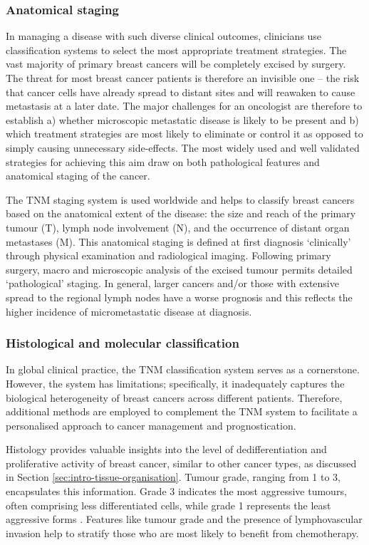 \subsubsection{Anatomical staging}

In managing a disease with such diverse clinical outcomes, clinicians use classification systems to select the most appropriate treatment strategies. The vast majority of primary breast cancers will be completely excised by surgery. The threat for most breast cancer patients is therefore an invisible one – the risk that cancer cells have already spread to distant sites and will reawaken to cause metastasis at a later date. The major challenges for an oncologist are therefore to establish a) whether microscopic metastatic disease is likely to be present and b) which treatment strategies are most likely to eliminate or control it as opposed to simply causing unnecessary side-effects. The most widely used and well validated strategies for achieving this aim draw on both pathological features and anatomical staging of the cancer.

The TNM staging system is used worldwide and helps to classify breast cancers based on the anatomical extent of the disease: the size and reach of the primary tumour (T), lymph node involvement (N), and the occurrence of distant organ metastases (M). This anatomical staging is defined at first diagnosis `clinically' through physical examination and radiological imaging. Following primary surgery, macro and microscopic analysis of the excised tumour permits detailed `pathological' staging.  In general, larger cancers and/or those with extensive spread to the regional lymph nodes have a worse prognosis and this reflects the higher incidence of micrometastatic disease at diagnosis. 

\subsubsection{Histological and molecular classification}

In global clinical practice, the TNM classification system serves as a cornerstone. However, the system has limitations; specifically, it inadequately captures the biological heterogeneity of breast cancers across different patients. Therefore, additional methods are employed to complement the TNM system to facilitate a personalised approach to cancer management and prognostication.

Histology provides valuable insights into the level of dedifferentiation and proliferative activity of breast cancer, similar to other cancer types, as discussed in Section \cref{sec:intro-tissue-organisation}. Tumour grade, ranging from 1 to 3, encapsulates this information. Grade 3 indicates the most aggressive tumours, often comprising less differentiated cells, while grade 1 represents the least aggressive forms \parencite{Greenough1925-wg, Elston1991-md}. Features like tumour grade and the presence of lymphovascular invasion help to stratify those who are most likely to benefit from chemotherapy. 

